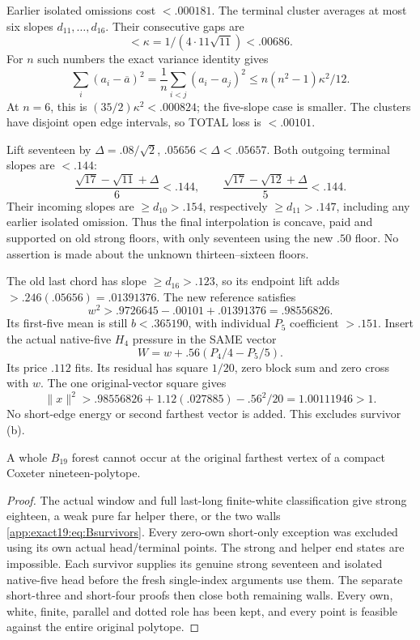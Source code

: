 Earlier isolated omissions cost
\(<.000181\).
The terminal cluster averages
at most six slopes
\(d_{11},\ldots,d_{16}\).
Their consecutive gaps are
\[
                        <\kappa=1/(4\cdot11\sqrt{11})<.00686 .
\]
For \(n\) such numbers the exact
variance identity gives
\[
 \sum_i(a_i-\overline a)^2
 =\frac1n\sum_{i<j}(a_i-a_j)^2
                         \le n(n^2-1)\kappa^2/12 .
\]
At \(n=6\), this is
\((35/2)\kappa^2<.000824\);
the five-slope case is smaller.
The clusters have disjoint open
edge intervals, so TOTAL loss
is \(<.00101\).

Lift seventeen by
\(\Delta=.08/\sqrt2\),
\(.05656<\Delta<.05657\).
Both outgoing terminal slopes
are \(<.144\):
\[
 \frac{\sqrt{17}-\sqrt{11}+\Delta}{6}<.144,\qquad
 \frac{\sqrt{17}-\sqrt{12}+\Delta}{5}<.144 .
\]
Their incoming slopes are
\(\ge d_{10}>.154\), respectively
\(\ge d_{11}>.147\), including
any earlier isolated omission.
Thus the final interpolation is
concave, paid and supported on
old strong floors, with only
seventeen using the new \(.50\)
floor.
No assertion is made about the
unknown thirteen--sixteen floors.

The old last chord has slope
\(\ge d_{16}>.123\), so its
endpoint lift adds
\(>.246(.05656)=.01391376\).
The new reference satisfies
\[
                          w^2>.9726645-.00101+.01391376=.98556826 .
\]
Its first-five mean is still
\(b<.365190\), with individual
\(P_5\) coefficient \(>.151\).
Insert the actual native-five
\(H_4\) pressure in the SAME
vector
\[
                               W=w+.56(P_4/4-P_5/5).
\]
Its price \(.112\) fits.
Its residual has square \(1/20\),
zero block sum and zero cross
with \(w\).
The one original-vector square
gives
\[
 \|x\|^2>.98556826+1.12(.027885)-.56^2/20
                              =1.00111946>1 .
\]
No short-edge energy or second
farthest vector is added.
This excludes survivor (b).

\begin{proposition}\label{app:exact19:prop:wholeB19}
A whole \(B_{19}\) forest cannot
occur at the original farthest
vertex of a compact Coxeter
nineteen-polytope.
\end{proposition}
\begin{proof}
The actual window and full
last-long finite-white classification
give strong eighteen, a weak pure
far helper there, or the two walls
\eqref{app:exact19:eq:Bsurvivors}.
Every zero-own short-only
exception was excluded using its
own actual head/terminal points.
The strong and helper end states
are impossible.
Each survivor supplies its genuine
strong seventeen and isolated
native-five head before the fresh
single-index arguments use them.
The separate short-three and
short-four proofs then close both
remaining walls.
Every own, white, finite, parallel
and dotted role has been kept,
and every point is feasible against
the entire original polytope.
\end{proof}


